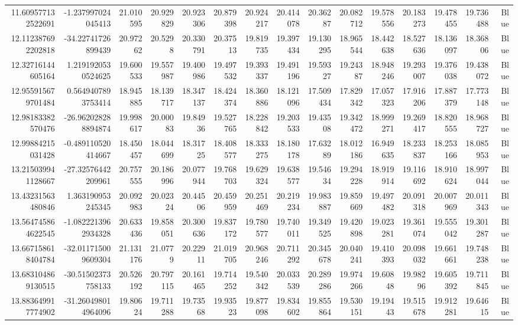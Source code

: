 \begin{center}
\begin{longtable}{rrrrrrrrrrrrrrr}
11.609577132522691 & -1.237997024045413 & 21.010595 & 20.929829 & 20.923306 & 20.879398 & 20.924217 & 20.414078 & 20.36287 & 20.082712 & 19.578556 & 20.183273 & 19.478455 & 19.736488 & Blue \\
12.112387692202818 & -34.22741726899439 & 20.97262 & 20.5298 & 20.330791 & 20.37513 & 19.819735 & 19.397434 & 19.130295 & 18.965544 & 18.442638 & 18.527636 & 18.136097 & 18.36806 & Blue \\
12.32716144605164 & 1.2191920530524625 & 19.600533 & 19.557987 & 19.400986 & 19.497532 & 19.393337 & 19.491196 & 19.59327 & 19.24387 & 18.948246 & 19.293007 & 19.376038 & 19.438072 & Blue \\
12.955915679701484 & 0.5649407893753414 & 18.945885 & 18.139717 & 18.347137 & 18.424374 & 18.360886 & 18.121096 & 17.509434 & 17.829342 & 17.057323 & 17.916206 & 17.887379 & 17.773148 & Blue \\
12.98183382570476 & -26.962028288894874 & 19.998617 & 20.00083 & 19.84936 & 19.527765 & 18.228842 & 19.203533 & 19.43508 & 19.342472 & 18.999271 & 19.269417 & 18.820555 & 18.968727 & Blue \\
12.99884215031428 & -0.489110520414667 & 18.450457 & 18.044699 & 18.31725 & 18.408577 & 18.333275 & 18.180178 & 17.63289 & 18.012186 & 16.949635 & 18.233837 & 18.253166 & 18.085953 & Blue \\
13.215039941128667 & -27.32576442209961 & 20.757555 & 20.186996 & 20.077944 & 19.768703 & 19.629324 & 19.638577 & 19.54634 & 19.294228 & 18.919914 & 19.116692 & 18.910624 & 18.997044 & Blue \\
13.43231563480846 & 1.363190953245345 & 20.092983 & 20.02324 & 20.44506 & 20.459959 & 20.251469 & 20.219234 & 19.983887 & 19.859669 & 19.497482 & 20.091318 & 20.007969 & 20.011343 & Blue \\
13.564745864622545 & -1.0822213962934328 & 20.633436 & 19.858051 & 20.300636 & 19.837172 & 19.780577 & 19.740011 & 19.349525 & 19.420898 & 19.023281 & 19.361074 & 19.555042 & 19.301287 & Blue \\
13.667158618404784 & -32.011715009609304 & 21.131176 & 21.0779 & 20.22911 & 21.019705 & 20.968246 & 20.711292 & 20.345678 & 20.040241 & 19.410393 & 20.098032 & 19.661661 & 19.748238 & Blue \\
13.683104869130515 & -30.51502373758133 & 20.526192 & 20.797115 & 20.161465 & 19.714252 & 19.540342 & 20.033539 & 20.289286 & 19.974266 & 19.60848 & 19.98296 & 19.605392 & 19.711845 & Blue \\
13.883649917774902 & -31.260498014964096 & 19.80624 & 19.711288 & 19.73568 & 19.93523 & 19.877098 & 19.834602 & 19.855864 & 19.530151 & 19.19443 & 19.515678 & 19.912281 & 19.64615 & Blue \\

\end{longtable}
\end{center}
